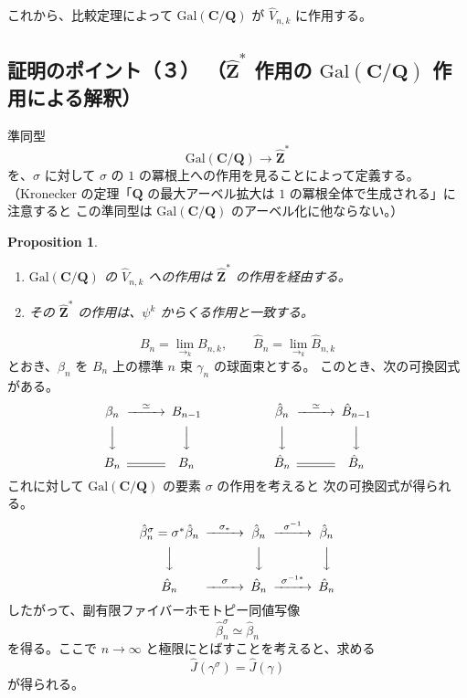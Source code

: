 \documentclass[uplatex,dvipdfmx,a4paper,12pt]{jlreq}
\newtheorem{proposition}[theorem]{Proposition}
\newcommand{\Z}{\mathbf{Z}}
\newcommand{\C}{\mathbf{C}}
\newcommand{\Q}{\mathbf{Q}}
\begin{document}
これから、比較定理によって $\mathrm{Gal}(\C/\Q)$ が $\hat{V}_{n,k}$ に作用する。

\subsection{証明のポイント（３）
（$\hat{\Z}^*$ 作用の $\mathrm{Gal}(\C/\Q)$ 作用による解釈）}

準同型
\[
  \mathrm{Gal}(\C/\Q) \longrightarrow \hat{\Z}^*
\]
を、$\sigma$ に対して $\sigma$ の $1$ の冪根上への作用を見ることによって定義する。
（Kronecker の定理「$\Q$ の最大アーベル拡大は $1$ の冪根全体で生成される」に注意すると
この準同型は $\mathrm{Gal}(\C/\Q)$ のアーベル化に他ならない。）

\begin{proposition}
  \begin{enumerate}
    \item $\mathrm{Gal}(\C/\Q)$ の $\hat{V}_{n,k}$ への作用は
          $\hat{\Z}^*$ の作用を経由する。
    \item その $\hat{\Z}^*$ の作用は、$\psi^k$ からくる作用と一致する。
  \end{enumerate}
\end{proposition}

\[
  B_n = \lim_{\longrightarrow_k} B_{n,k}, \qquad
  \hat{B}_n = \lim_{\longrightarrow_k} \hat{B}_{n,k}
\]
とおき、$\beta_n$ を $B_n$ 上の標準 $n$ 束 $\gamma_n$ の球面束とする。
このとき、次の可換図式がある。
\[
  \begin{CD}
    \beta_n  @>{\simeq}>> B_{n-1} \\
    @VVV                  @VVV    \\
    B_n      @=           B_n
  \end{CD}
  \hspace{2cm}
  \begin{CD}
    \hat{\beta}_n  @>{\simeq}>> \hat{B}_{n-1} \\
    @VVV                        @VVV           \\
    \hat{B}_n      @=           \hat{B}_n
  \end{CD}
\]
これに対して $\mathrm{Gal}(\C/\Q)$ の要素 $\sigma$ の作用を考えると
次の可換図式が得られる。
\[
  \begin{CD}
    \hat{\beta}_n^\sigma = \sigma^* \hat{\beta}_n
      @>{\sigma_*}>> \hat{\beta}_n @>{\sigma^{-1}}>> \hat{\beta}_n \\
    @VVV              @VVV                            @VVV           \\
    \hat{B}_n @>{\sigma}>> \hat{B}_n @>{\sigma^{-1*}}>> \hat{B}_n
  \end{CD}
\]
したがって、副有限ファイバーホモトピー同値写像
\[
  \hat{\beta}_n^\sigma \simeq \hat{\beta}_n
\]
を得る。ここで $n \to \infty$ と極限にとばすことを考えると、求める
\[
  \hat{J}(\gamma^\sigma) = \hat{J}(\gamma)
\]
が得られる。
\end{document}
